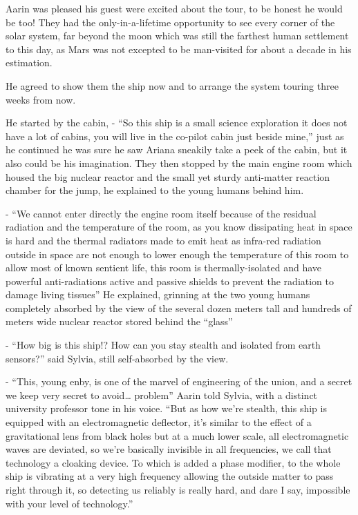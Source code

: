 \documentclass[colorlinks,12pt,a4paper]{book}
\begin{document}
Aarin was pleased his guest were excited about the tour, to be honest he would be too! They had the only-in-a-lifetime 
opportunity to see every corner of the solar system, far beyond the moon which was still the farthest human settlement 
to this day, as Mars was not excepted to be man-visited for about a decade in his estimation.\par
\bigskip

He agreed to show them the ship now and to arrange the system touring three weeks from now.\par
\bigskip


He started by the cabin, - “So this ship is a small science exploration it does not have a lot of cabins, you will live 
in the co-pilot cabin just beside mine,” just as he continued he was sure he saw Ariana sneakily take a peek of the 
cabin, but it also could be his imagination. They then stopped by the main engine room which housed the big nuclear 
reactor and the small yet sturdy anti-matter reaction chamber for the jump, he explained to the young humans behind him.\par
\bigskip

- “We cannot enter directly the engine room itself because of the residual radiation and the temperature of the
room, as you know dissipating heat in space is hard and the thermal radiators made to emit heat as infra-red radiation 
outside in space are not enough to lower enough the temperature of this room to allow most of known sentient life, 
this room is thermally-isolated and have powerful anti-radiations active and passive shields to prevent the 
radiation to damage living tissues” He explained, grinning at the two young humans completely absorbed by the view 
of the several dozen meters tall and hundreds of meters wide nuclear reactor stored behind the “glass”\par
\bigskip

- “How big is this ship!? How can you stay stealth and isolated from earth sensors?” said Sylvia, still self-absorbed by 
the view.\par
\bigskip

- “This, young enby, is one of the marvel of engineering of the union, and a secret we keep very secret to 
avoid… problem” Aarin told Sylvia, with a distinct university professor tone in his voice. “But as how we're stealth, 
this ship is equipped with an electromagnetic deflector, it's similar to the effect of a gravitational lens from black
 holes but at a much lower scale, all electromagnetic waves are deviated, so we're basically invisible in all 
 frequencies, we call that technology a cloaking device. To which is added a phase modifier, to the whole ship 
 is vibrating at a very high frequency allowing the outside matter to pass right through it, so detecting us 
 reliably is really hard, and dare I say, impossible with your level of technology.”\par
 \bigskip
\end{document}
